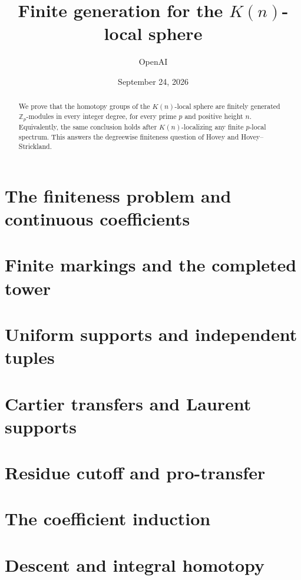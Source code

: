 \documentclass[11pt]{article}
\title{Finite generation for the \texorpdfstring{$K(n)$}{K(n)}-local sphere}
\author{OpenAI}
\date{September 24, 2026}
\begin{document}
\maketitle
\begin{abstract}
We prove that the homotopy groups of the $K(n)$-local sphere are finitely
generated $\mathbb Z_p$-modules in every integer degree, for every prime $p$
and positive height $n$. Equivalently, the same conclusion holds after
$K(n)$-localizing any finite $p$-local spectrum. This answers the degreewise
finiteness question of Hovey and Hovey--Strickland.
\end{abstract}
\tableofcontents
\clearpage
\part{The finiteness problem and continuous coefficients}\label{part:coefficients}


\clearpage
\part{Finite markings and the completed tower}\label{part:tower}


\clearpage
\part{Uniform supports and independent tuples}\label{part:supports}


\FloatBarrier
\clearpage
\part{Cartier transfers and Laurent supports}\label{part:cartier}


\clearpage
\part{Residue cutoff and pro-transfer}\label{part:cutoff}


\clearpage
\part{The coefficient induction}\label{part:induction}

\clearpage
\part{Descent and integral homotopy}\label{part:descent}

\begingroup
\raggedright


\endgroup
\end{document}
